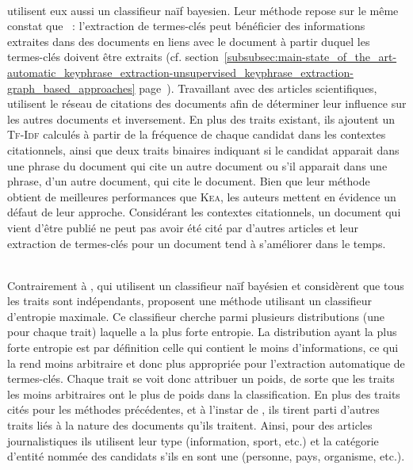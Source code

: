         ~\\ utilisent
        eux aussi un classifieur naïf bayesien. Leur méthode repose sur le même
        constat que ~: l'extraction de termes-clés
        peut bénéficier des informations extraites dans des documents en liens
        avec le document à partir duquel les termes-clés doivent être extraits
        (cf.
        section~\ref{subsubsec:main-state_of_the_art-automatic_keyphrase_extraction-unsupervised_keyphrase_extraction-graph_based_approaches}
        page~\pageref{subsubsec:main-state_of_the_art-automatic_keyphrase_extraction-unsupervised_keyphrase_extraction-graph_based_approaches}).
        Travaillant avec des articles scientifiques,
         utilisent le
        réseau de citations des documents afin de déterminer leur influence sur
        les autres documents et inversement. En plus des traits existant, ils
        ajoutent un \textsc{Tf-Idf} calculés à partir de la fréquence de chaque
        candidat dans les contextes citationnels, ainsi que deux traits binaires
        indiquant si le candidat apparait dans une phrase du document qui cite
        un autre document ou s'il apparait dans une phrase, d'un autre document,
        qui cite le document. Bien que leur méthode obtient de meilleures
        performances que \textsc{Kea}, les auteurs mettent en évidence un défaut
        de leur approche. Considérant les contextes citationnels, un document
        qui vient d'être publié ne peut pas avoir été cité par d'autres articles
        et leur extraction de termes-clés pour un document tend à s'améliorer
        dans le temps.

        ~\\Contrairement à , qui utilisent un classifieur
        naïf bayésien et considèrent que tous les traits sont indépendants,
         proposent une méthode utilisant un
        classifieur d'entropie maximale. Ce classifieur cherche parmi plusieurs
        distributions (une pour chaque trait) laquelle a la plus forte entropie.
        La distribution ayant la plus forte entropie est par définition celle
        qui contient le moins d'informations, ce qui la rend moins arbitraire et
        donc plus appropriée pour l'extraction automatique de termes-clés.
        Chaque trait se voit donc attribuer un poids, de sorte que les traits
        les moins arbitraires ont le plus de poids dans la classification. En
        plus des traits cités pour les méthodes précédentes, et à l'instar de
        , ils tirent parti d'autres
        traits liés à la nature des documents qu'ils traitent. Ainsi, pour des
        articles journalistiques ils utilisent leur type (information, sport,
        etc.) et la catégorie d'entité nommée des candidats s'ils en sont une
        (personne, pays, organisme, etc.).

